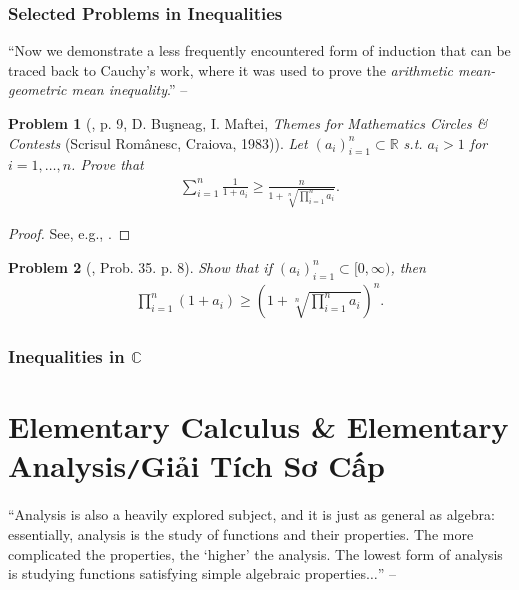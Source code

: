 \documentclass[oneside]{book}
\numberwithin{equation}{section}
\newtheorem{problem}{Problem}[section]
\begin{document}
\subsection{Selected Problems in Inequalities}
``Now we demonstrate a less frequently encountered form of induction that can be traced back to Cauchy's work, where it was used to prove the \textit{arithmetic mean-geometric mean inequality}.'' -- \cite[p. 9]{Gelca_Andreescu2017}

\begin{problem}[\cite{Gelca_Andreescu2017}, p. 9, D. Buşneag, I. Maftei, \textit{Themes for Mathematics Circles \& Contests} (Scrisul Românesc, Craiova, 1983)]
	Let $(a_i)_{i=1}^n\subset\mathbb{R}$ s.t. $a_i > 1$ for $i = 1,\ldots,n$. Prove that
	\begin{align*}
		\sum_{i=1}^n \frac{1}{1 + a_i}\ge\frac{n}{1 + \sqrt[n]{\prod_{i=1}^n a_i}}.
	\end{align*}
\end{problem}

\begin{proof}[Proof]
	See, e.g., \cite[pp. 9--10]{Gelca_Andreescu2017}.
\end{proof}

\begin{problem}[\cite{Gelca_Andreescu2017}, Prob. 35. p. 8]
	Show that if $(a_i)_{i=1}^n\subset[0,\infty)$, then
	\begin{align*}
		\prod_{i=1}^n (1 + a_i)\ge\left(1 + \sqrt[n]{\prod_{i=1}^n a_i}\right)^n.
	\end{align*}
\end{problem}

\subsection{Inequalities in $\mathbb{C}$}


\chapter{Elementary Calculus \& Elementary Analysis\texttt{/}Giải Tích Sơ Cấp}
``Analysis is also a heavily explored subject, and it is just as general as algebra: essentially, analysis is the study of functions and their properties. The more complicated the properties, the `higher' the analysis. The lowest form of analysis is studying functions satisfying simple algebraic properties$\ldots$'' -- \cite[Chap. 3, p. 36]{Tao2006}
\end{document}
